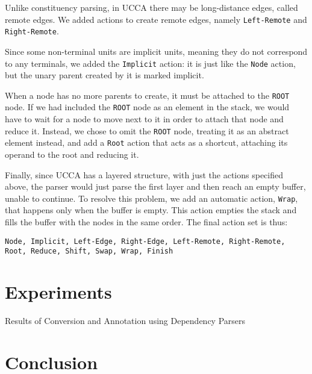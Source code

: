 \documentclass[11pt]{article}
\begin{document}
Unlike constituency parsing, in UCCA there may be long-distance edges, called remote edges. We added actions to create remote edges, namely \texttt{Left-Remote} and \texttt{Right-Remote}.

Since some non-terminal units are implicit units, meaning they do not correspond to any terminals, we added the \texttt{Implicit} action: it is just like the \texttt{Node} action, but the unary parent created by it is marked implicit.

When a node has no more parents to create, it must be attached to the \texttt{ROOT} node. If we had included the \texttt{ROOT} node as an element in the stack, we would have to wait for a node to move next to it in order to attach that node and reduce it. Instead, we chose to omit the \texttt{ROOT} node, treating it as an abstract element instead, and add a \texttt{Root} action that acts as a shortcut, attaching its operand to the root and reducing it.

Finally, since UCCA has a layered structure, with just the actions specified above, the parser would just parse the first layer and then reach an empty buffer, unable to continue. To resolve this problem, we add an automatic action, \texttt{Wrap}, that happens only when the buffer is empty. This action empties the stack and fills the buffer with the nodes in the same order.
The final action set is thus:

\texttt{Node, Implicit, Left-Edge, Right-Edge, Left-Remote, Right-Remote, Root, Reduce, Shift, Swap, Wrap, Finish}

\section{Experiments}

\begin{table*}
\caption{Results of Conversion and Annotation using Dependency Parsers}
\label{table:convert}
\end{table*}


\section{Conclusion}
\end{document}
